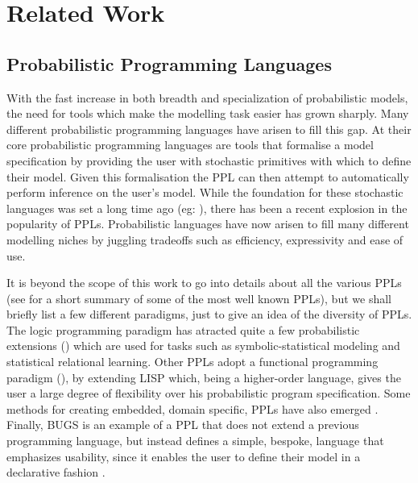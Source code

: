 \chapter{Related Work} 
\label{chap:relWork}

\section{Probabilistic Programming Languages}
\label{sect:ppl}
With the fast increase in both breadth and specialization of probabilistic models, the need for tools which make the modelling task easier has grown sharply. Many different probabilistic programming languages have arisen to fill this gap. At their core probabilistic programming languages are tools that formalise a model specification by providing the user with stochastic primitives with which to define their model. Given this formalisation the PPL can then attempt to automatically perform inference on the user's model. While the foundation for these stochastic languages was set a long time ago (eg: \cite{jones1989probabilistic}), there has been a recent explosion in the popularity of PPLs. Probabilistic languages have now arisen to fill many different modelling niches by juggling tradeoffs such as efficiency, expressivity and ease of use. 

It is beyond the scope of this work to go into details about all the various PPLs (see \cite{ppw} for a short summary of some of the most well known PPLs), but we shall briefly list a few different paradigms, just to give an idea of the diversity of PPLs. The logic programming paradigm has atracted quite a few probabilistic extensions (\cite{kimmig2011implementation, de2008probabilistic, sato1997prism, poole2008independent}) which are used for tasks such as symbolic-statistical modeling and statistical relational learning. Other PPLs adopt a functional programming paradigm (\cite{goodman2008church, mansinghka2014venture, wood2014new}), by extending LISP \cite{abelson1991revised} which, being a higher-order language, gives the user a large degree of flexibility over his probabilistic program specification. Some methods for creating embedded, domain specific, PPLs have also emerged \cite{kiselyov2009embedded}. Finally, BUGS is an example of a PPL that does not extend a previous programming language, but instead defines a simple, bespoke, language that emphasizes usability, since it enables the user to define their model in a declarative fashion \cite{lunn2009bugs}.


